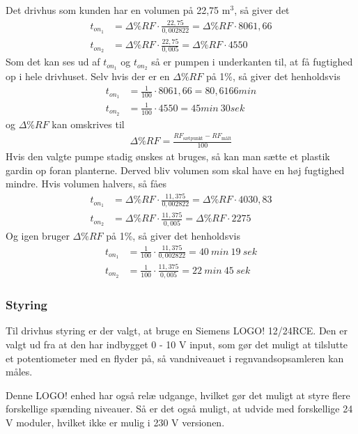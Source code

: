 Det drivhus som kunden har en volumen på 22,75 m$^3$, så giver det
\begin{align}
    t_{on_{1}} & = \Delta\%RF\cdot\frac{ 22,75 }{0,002822} = \Delta\%RF\cdot8061,66 \\
    t_{on_{2}} & = \Delta\%RF\cdot\frac{ 22,75 }{0,005} = \Delta\%RF\cdot4550 
\end{align}
Som det kan ses ud af $t_{on_{1}}$ og $t_{on_{2}}$ så er pumpen i underkanten til, at få fugtighed op i hele drivhuset.
Selv hvis der er en $\Delta\%RF$ på 1\%, så giver det henholdsvis
\begin{align}
    t_{on_{1}} &= \frac{1}{100} \cdot 8061,66 = 80,6166 min \\
    t_{on_{2}} &= \frac{1}{100} \cdot 4550 = 45 min \ 30 sek
\end{align}
og $\Delta\%RF$ kan omskrives til 
\begin{align}
    \Delta\%RF = \frac{ RF_{\text{sætpunkt}} - RF_{\text{målt}} }{ 100 }
\end{align}
Hvis den valgte pumpe stadig ønskes at bruges, så kan man sætte et plastik gardin op foran planterne.
Derved bliv volumen som skal have en høj fugtighed mindre. Hvis volumen halvers, så fåes
\begin{align}
    t_{on_{1}} & = \Delta\%RF\cdot\frac{ 11,375 }{0,002822} = \Delta\%RF\cdot4030,83 \\
    t_{on_{2}} & = \Delta\%RF\cdot\frac{ 11,375 }{0,005} = \Delta\%RF\cdot2275 
\end{align}
Og igen bruger $\Delta\%RF$ på 1\%, så giver det henholdsvis
\begin{align}
    t_{on_{1}} & = \frac{1}{100}\cdot\frac{ 11,375 }{0,002822} = 40 \ min \ 19 \ sek\\
    t_{on_{2}} & = \frac{1}{100}\cdot\frac{ 11,375 }{0,005} = 22 \ min \ 45 \ sek
\end{align}

\subsubsection{Styring}
Til drivhus styring er der valgt, at bruge en Siemens LOGO! 12/24RCE. 
Den er valgt ud fra at den har indbygget 0 - 10 V input, 
som gør det muligt at tilslutte et potentiometer med en flyder på, 
så vandniveauet i regnvandsopsamleren kan måles.

Denne LOGO! enhed har også relæ udgange, 
hvilket gør det muligt at styre flere forskellige spænding niveauer.
Så er det også muligt, at udvide med forskellige 24 V moduler, hvilket ikke er mulig i 230 V versionen.

